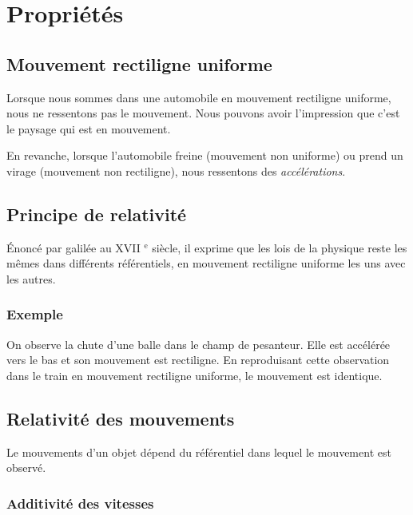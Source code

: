 

\section{Propriétés}

    \subsection{Mouvement rectiligne uniforme}

Lorsque nous sommes dans une automobile en mouvement rectiligne uniforme, nous ne ressentons pas le mouvement. Nous pouvons avoir l'impression que c'est le paysage qui est en mouvement.

 En revanche, lorsque l'automobile freine (mouvement non uniforme) ou prend un virage (mouvement non rectiligne), nous ressentons des {\it accélérations}.


\begin{center}

\end{center}


  \subsection{Principe de relativité}

Énoncé par galilée au {\footnotesize XVII} $^\text{e}$ siècle, il exprime que les lois de la physique reste les mêmes dans  différents référentiels, en mouvement rectiligne uniforme les uns avec les autres.

    \subsubsection{Exemple}

On observe la chute d'une balle dans le champ de pesanteur. Elle est accélérée vers le bas et son mouvement est rectiligne. En reproduisant cette observation dans le train en mouvement rectiligne uniforme, le mouvement est identique.

  \subsection{Relativité des mouvements}

Le mouvements d'un objet dépend du référentiel dans lequel le mouvement est observé.

    \subsubsection{Additivité des vitesses}

